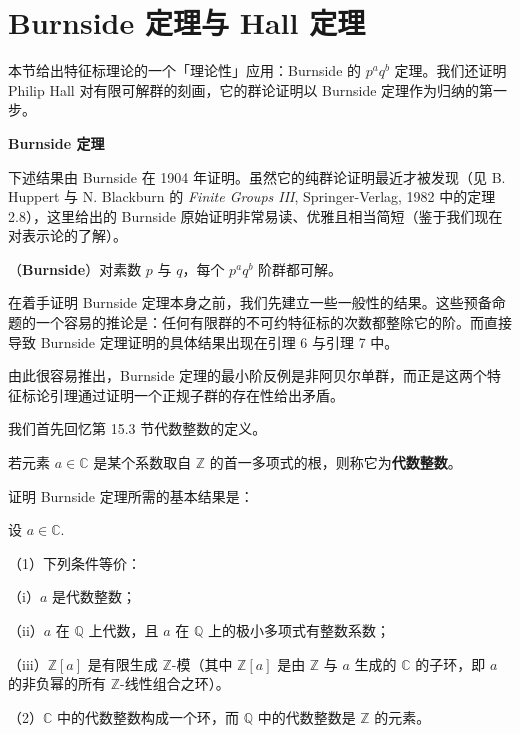 \section{Burnside 定理与 Hall 定理}

本节给出特征标理论的一个「理论性」应用：Burnside 的 \(p^aq^b\) 定理。我们还证明 Philip Hall 对有限可解群的刻画，它的群论证明以 Burnside 定理作为归纳的第一步。

\noindent\textbf{Burnside 定理}

下述结果由 Burnside 在 1904 年证明。虽然它的纯群论证明最近才被发现（见 B. Huppert 与 N. Blackburn 的 \textit{Finite Groups III}, Springer-Verlag, 1982 中的定理 2.8），这里给出的 Burnside 原始证明非常易读、优雅且相当简短（鉴于我们现在对表示论的了解）。

\begin{theorem}\label{thm:19.1}
（\textbf{Burnside}）对素数 \(p\) 与 \(q\)，每个 \(p^aq^b\) 阶群都可解。
\end{theorem}

在着手证明 Burnside 定理本身之前，我们先建立一些一般性的结果。这些预备命题的一个容易的推论是：任何有限群的不可约特征标的次数都整除它的阶。而直接导致 Burnside 定理证明的具体结果出现在引理 6 与引理 7 中。

由此很容易推出，Burnside 定理的最小阶反例是非阿贝尔单群，而正是这两个特征标论引理通过证明一个正规子群的存在性给出矛盾。

我们首先回忆第 15.3 节代数整数的定义。

\begin{definition}
若元素 \(a \in \mathbb{C}\) 是某个系数取自 \(\mathbb{Z}\) 的首一多项式的根，则称它为\textbf{代数整数}。
\end{definition}

证明 Burnside 定理所需的基本结果是：

\begin{proposition}\label{pro:19.2}
设 \(a \in \mathbb{C}\).

（1）下列条件等价：

（i）\(a\) 是代数整数；

（ii）\(a\) 在 \(\mathbb{Q}\) 上代数，且 \(a\) 在 \(\mathbb{Q}\) 上的极小多项式有整数系数；

（iii）\(\mathbb{Z}[a]\) 是有限生成 \(\mathbb{Z}\)-模（其中 \(\mathbb{Z}[a]\) 是由 \(\mathbb{Z}\) 与 \(a\) 生成的 \(\mathbb{C}\) 的子环，即 \(a\) 的非负幂的所有 \(\mathbb{Z}\)-线性组合之环）。

（2）\(\mathbb{C}\) 中的代数整数构成一个环，而 \(\mathbb{Q}\) 中的代数整数是 \(\mathbb{Z}\) 的元素。
\end{proposition}

